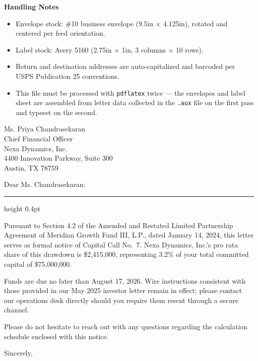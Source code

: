 \documentclass[11pt]{letter}
\begin{document}
\vspace{16pt}
\begin{tcolorbox}[colback=cream,colframe=hairline,arc=2pt,boxrule=0.6pt,
  left=8pt,right=8pt,top=6pt,bottom=6pt,width=\linewidth]
\textbf{\color{inkslate}Handling Notes}\\[4pt]
\begin{itemize}[leftmargin=1.3em,itemsep=3pt,topsep=2pt]
  \item Envelope stock: \#10 business envelope (9.5in $\times$ 4.125in), rotated and centered per feed orientation.
  \item Label stock: Avery 5160 (2.75in $\times$ 1in, 3 columns $\times$ 10 rows).
  \item Return and destination addresses are auto-capitalized and barcoded per USPS Publication 25 conventions.
  \item This file must be processed with \texttt{pdflatex} twice --- the envelopes and label sheet are assembled from letter data collected in the \texttt{.aux} file on the first pass and typeset on the second.
\end{itemize}
\end{tcolorbox}

\begin{letter}{Ms. Priya Chandrasekaran\\
  Chief Financial Officer\\
  Nexa Dynamics, Inc.\\
  4400 Innovation Parkway, Suite 300\\
  Austin, TX 78759}

\opening{Dear Ms. Chandrasekaran:}
\vspace{-0.4\baselineskip}
{\color{hairline}\hrule height 0.4pt}
\vspace{0.6\baselineskip}

Pursuant to Section 4.2 of the Amended and Restated Limited Partnership Agreement of Meridian Growth Fund III, L.P., dated January 14, 2024, this letter serves as formal notice of Capital Call No.\ 7. Nexa Dynamics, Inc.'s pro rata share of this drawdown is \$2,415,000, representing 3.2\% of your total committed capital of \$75,000,000.

Funds are due no later than August 17, 2026. Wire instructions consistent with those provided in our May 2025 investor letter remain in effect; please contact our operations desk directly should you require them resent through a secure channel.

Please do not hesitate to reach out with any questions regarding the calculation schedule enclosed with this notice.

\closing{Sincerely,}
\end{letter}
\end{document}
